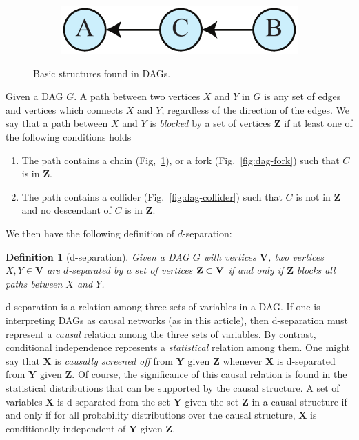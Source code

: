 \documentclass[12pt,onecolumn,nofootinbib]{revtex4-2}
\newtheorem{definition}[theorem]{Definition}
\def\indep{\perp\!\!\!\!\perp}
\begin{document}
\begin{appendix}
\begin{figure}[h]
\begin{subfigure}[b]{0.18\textwidth}
		\vspace{1em}
		\includegraphics[width=\textwidth]{markovchain2}
		\label{fig:dag-chain}
	\end{subfigure}
        \caption{Basic structures found in DAGs.}
        \label{fig:dag-elts}
\end{figure}

Given a DAG $G$. A path between two vertices $X$ and $Y$ in $G$ is any set of edges and vertices which connects $X$ and $Y$, regardless of the direction of the edges. We say that a path between $X$ and $Y$ is \emph{blocked} by a set of vertices $\mathbf{Z}$ if at least one of the following conditions holds

\begin{enumerate}
\item The path contains a chain (Fig,~\ref{fig:dag-chain}), or a fork (Fig.~\ref{fig:dag-fork}) such that $C$ is in $\mathbf{Z}$.
\item The path contains a collider (Fig.~\ref{fig:dag-collider}) such that $C$ is not in $\mathbf{Z}$ and no descendant of $C$ is in $\mathbf{Z}$.
\end{enumerate}


We then have the following definition of $d$-separation:

\begin{definition}[d-separation]
Given a DAG $G$ with vertices $\textbf{V}$, two vertices $X,Y\in \mathbf{V}$ are $d$-separated by a set of vertices ${\bf Z} \subset \mathbf{V}$
  if and only if $\mathbf{Z}$ blocks all paths between $X$ and $Y$.
\end{definition}


d-separation is a relation among three sets of variables in a DAG.  If one is interpreting DAGs as causal networks (as in this article), then d-separation must represent a \emph{causal} relation among the three sets of variables.  By contrast, conditional independence represents a \emph{statistical} relation among them.  One might say that $\mathbf{X}$ is \emph{causally screened off} from $\mathbf{Y}$ given $\mathbf{Z}$ whenever $\mathbf{X}$ is d-separated from $\mathbf{Y}$ given $\mathbf{Z}$.  Of course, the significance of this causal relation is found in the statistical distributions that can be supported by the causal structure.  A set of variables $\mathbf{X}$ is d-separated from the set $\mathbf{Y}$ given the set $\mathbf{Z}$ in a causal structure if and only if for all probability distributions over the causal structure, $\mathbf{X}$ is conditionally independent of $\mathbf{Y}$ given $\mathbf{Z}$.


\end{appendix}
\end{document}
